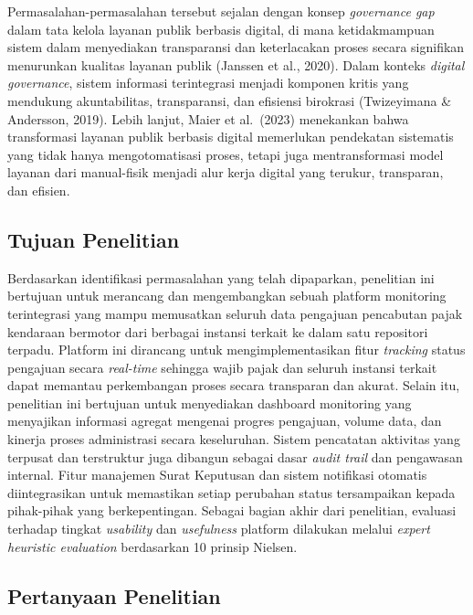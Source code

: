 \documentclass[conference]{IEEEtran}
\begin{document}
Permasalahan-permasalahan tersebut sejalan dengan konsep \emph{governance gap}
dalam tata kelola layanan publik berbasis digital, di mana ketidakmampuan sistem
dalam menyediakan transparansi dan keterlacakan proses secara signifikan
menurunkan kualitas layanan publik (Janssen et al., 2020). Dalam konteks
\emph{digital governance}, sistem informasi terintegrasi menjadi komponen
kritis yang mendukung akuntabilitas, transparansi, dan efisiensi birokrasi
(Twizeyimana \& Andersson, 2019). Lebih lanjut, Maier et al.~(2023) menekankan
bahwa transformasi layanan publik berbasis digital memerlukan pendekatan
sistematis yang tidak hanya mengotomatisasi proses, tetapi juga mentransformasi
model layanan dari manual-fisik menjadi alur kerja digital yang terukur,
transparan, dan efisien.

\subsection{Tujuan Penelitian}
\label{subsec:tujuan}

Berdasarkan identifikasi permasalahan yang telah dipaparkan, penelitian ini
bertujuan untuk merancang dan mengembangkan sebuah platform monitoring terintegrasi
yang mampu memusatkan seluruh data pengajuan pencabutan pajak kendaraan bermotor
dari berbagai instansi terkait ke dalam satu repositori terpadu. Platform ini
dirancang untuk mengimplementasikan fitur \emph{tracking} status pengajuan
secara \emph{real-time} sehingga wajib pajak dan seluruh instansi terkait dapat
memantau perkembangan proses secara transparan dan akurat. Selain itu, penelitian
ini bertujuan untuk menyediakan dashboard monitoring yang menyajikan informasi
agregat mengenai progres pengajuan, volume data, dan kinerja proses administrasi
secara keseluruhan. Sistem pencatatan aktivitas yang terpusat dan terstruktur
juga dibangun sebagai dasar \emph{audit trail} dan pengawasan internal. Fitur
manajemen Surat Keputusan dan sistem notifikasi otomatis diintegrasikan untuk
memastikan setiap perubahan status tersampaikan kepada pihak-pihak yang
berkepentingan. Sebagai bagian akhir dari penelitian, evaluasi terhadap tingkat
\emph{usability} dan \emph{usefulness} platform dilakukan melalui \emph{expert
heuristic evaluation} berdasarkan 10 prinsip Nielsen.

\subsection{Pertanyaan Penelitian}
\label{subsec:pertanyaan}
\end{document}
